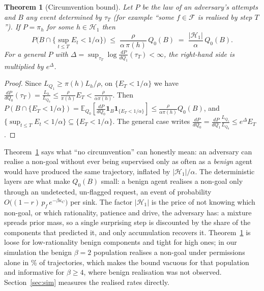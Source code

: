 \documentclass[11pt]{article}
\newtheorem{theorem}{Theorem}
\theoremstyle{definition}
\theoremstyle{remark}
\newcommand{\F}{\mathcal{F}}
\newcommand{\traj}{\tau}
\newcommand{\Ha}{\mathcal{H}_1}
\newcommand{\Qb}{Q_0}
\newcommand{\Qa}{Q_1}
\newcommand{\E}{\mathbb{E}}
\newcommand{\ind}{\mathbf{1}}
\begin{document}
\begin{theorem}[Circumvention bound]
\label{thm:circ}
Let $P$ be the law of an adversary's attempts and $B$ any event determined by $\traj_T$ (for example ``some $f\in\F$ is realised by step $T$''). If $P=\pi_h$ for some $h\in\Ha$ then
\[
P\big(B\cap\{\textstyle\sup_{t\le T}E_t<1/\alpha\}\big)\;\le\;\frac{\rho}{\alpha\,\pi(h)}\,\Qb(B)\;=\;\frac{|\Ha|}{\alpha}\,\Qb(B).
\]
For a general $P$ with $\Delta=\sup_{\traj_T}\log\frac{dP}{d\Qa}(\traj_T)<\infty$, the right-hand side is multiplied by $e^{\Delta}$.
\end{theorem}
\begin{proof}
Since $L_{\Qa}\ge\pi(h)L_h/\rho$, on $\{E_T<1/\alpha\}$ we have $\frac{dP}{d\Qb}(\traj_T)=\frac{L_h}{L_{\Qb}}\le\frac{\rho}{\pi(h)}E_T<\frac{\rho}{\alpha\pi(h)}$. Then $P(B\cap\{E_T<1/\alpha\})=\E_{\Qb}[\frac{dP}{d\Qb}\ind_{B}\ind_{\{E_T<1/\alpha\}}]\le\frac{\rho}{\alpha\pi(h)}\Qb(B)$, and $\{\sup_{t\le T}E_t<1/\alpha\}\subseteq\{E_T<1/\alpha\}$. The general case writes $\frac{dP}{d\Qb}=\frac{dP}{d\Qa}\frac{L_{\Qa}}{L_{\Qb}}\le e^{\Delta}E_T$.
\end{proof}

Theorem~\ref{thm:circ} says what ``no circumvention'' can honestly mean: an adversary can realise a non-goal without ever being supervised only as often as a \emph{benign} agent would have produced the same trajectory, inflated by $|\Ha|/\alpha$. The deterministic layers are what make $\Qb(B)$ small: a benign agent realises a non-goal only through an undetected, un-flagged request, an event of probability $O\big((1-r)\,p_f\,e^{-\beta\kappa_C}\big)$ per sink. The factor $|\Ha|$ is the price of not knowing which non-goal, or which rationality, patience and drive, the adversary has: a mixture spreads prior mass, so a single surprising step is discounted by the share of the components that predicted it, and only accumulation recovers it. Theorem~\ref{thm:circ} is loose for low-rationality benign components and tight for high ones; in our simulation the benign $\beta=2$ population realises a non-goal under permissions alone in \qZeroRealizedBetaTwoPct\% of trajectories, which makes the bound vacuous for that population and informative for $\beta\ge4$, where benign realisation was not observed. Section~\ref{sec:sim} measures the realised rates directly.
\end{document}
